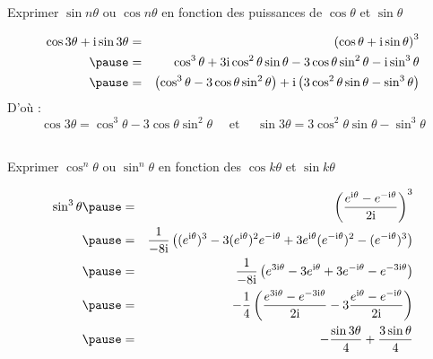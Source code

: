 \begin{frame}

\\
Exprimer $\sin n \theta$ ou $\cos n \theta$ en
fonction des puissances de $\cos \theta$ et $\sin \theta$

\pause

\begin{exemple}
\vspace{-1em}
\begin{eqnarray*}
  \cos 3 \theta + \ii  \sin 3 \theta & = & \left( \cos \theta + \ii  \sin \theta
  \right)^3\\
\pause
  & = & \cos^3 \theta + 3 \ii  \cos^2 \theta \sin \theta - 3 \cos \theta \sin^2
  \theta - \ii  \sin^3 \theta\\
\pause
  & = & \left( \cos^3 \theta - 3 \cos \theta \sin^2 \theta \right) + \ii  \left(
  3 \cos^2 \theta \sin \theta - \sin^3 \theta \right)
\end{eqnarray*}
\pause
D'où :
\[ \cos 3 \theta = \cos^3 \theta - 3 \cos \theta \sin^2 \theta \quad \text{ et } \quad 
   \sin 3 \theta = 3 \cos^2 \theta \sin \theta - \sin^3 \theta  \]
\end{exemple}

\end{frame}


\begin{frame}

\\
Exprimer $\cos^n \theta$ ou $\sin^n \theta$ en fonction des $\cos k \theta$ 
et $\sin k\theta$

\pause

\begin{exemple}
\vspace{-1em}
\begin{eqnarray*}
  \sin^3 \theta 
\pause & = & \left( \frac{e^{\ii  \theta} - e^{- \ii  \theta}}{2 \ii }
  \right)^3\\
\pause
 & = & \frac{1}{- 8 \ii }  \left( (e^{\ii  \theta})^3 - 3 (e^{\ii  \theta})^2e^{- \ii  \theta} 
+ 3 e^{\ii  \theta}(e^{-\ii  \theta})^2 - (e^{- \ii  \theta})^3 \right)\\
\pause
 & = & \frac{1}{- 8 \ii }  \left( e^{3 \ii  \theta} - 3 e^{\ii  \theta} + 3 e^{-
  \ii  \theta} - e^{- 3 \ii  \theta} \right)\\
\pause
  & = & - \frac{1}{4} \left( \frac{e^{3 \ii  \theta} -  e^{-3 \ii \theta}}{2 \ii } - 3
  \frac{e^{\ii  \theta} - e^{-\ii  \theta}}{2 \ii } \right)\\
\pause
  & = & - \frac{\sin 3 \theta}{4}
  + \frac{3 \sin \theta}{4}
\end{eqnarray*}
\end{exemple}

\end{frame}


